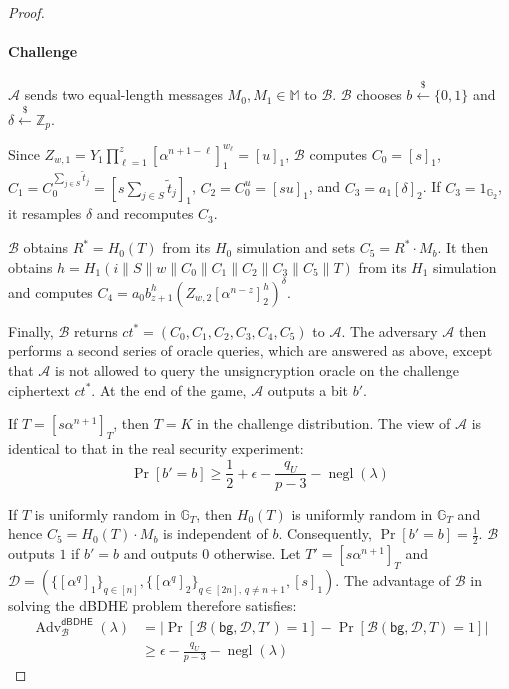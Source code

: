 \documentclass[sigconf,anonymous]{acmart}
\theoremstyle{definition}
\theoremstyle{definition}
\theoremstyle{definition}
\theoremstyle{definition}
\theoremstyle{definition}
\theoremstyle{definition}
\theoremstyle{definition}
\theoremstyle{definition}
\theoremstyle{definition}
\begin{document}
\begin{proof}
\begin{itemize}
	\end{itemize}
	
	\paragraph{\textbf{Challenge}}
	$\mathcal{A}$ sends two equal-length messages
	$M_0,M_1\in\mathbb{M}$ to $\mathcal{B}$.
	$\mathcal{B}$ chooses
	$b\overset{\$}{\leftarrow}\{0,1\}$ and
	$\delta\overset{\$}{\leftarrow}\mathbb{Z}_p$.
	
	Since
	$Z_{w,1}
	=Y_1\prod_{\ell=1}^{z}
	[\alpha^{n+1-\ell}]_1^{w_\ell}
	=[u]_1$,
	$\mathcal{B}$ computes
	$C_0=[s]_1$,
	$C_1=C_0^{\sum_{j\in S}\widetilde t_j}
	=[s\sum_{j\in S}\widetilde t_j]_1$,
	$C_2=C_0^u=[su]_1$, and
	$C_3=a_1[\delta]_2$.
	If $C_3=1_{\mathbb{G}_2}$, it resamples $\delta$ and recomputes $C_3$.
	
	$\mathcal{B}$ obtains $R^*=H_0(T)$ from its $H_0$ simulation and sets
	$C_5=R^*\cdot M_b$.
	It then obtains
	$h=H_1(i\parallel S\parallel w\parallel C_0\parallel C_1\parallel
	C_2\parallel C_3\parallel C_5\parallel T)$
	from its $H_1$ simulation and computes
	$C_4=a_0b_{z+1}^{h}
	(Z_{w,2}[\alpha^{n-z}]_2^{h})^{\delta}$.
	
	Finally, $\mathcal{B}$ returns
	$ct^{*}=(C_0,C_1,C_2,C_3,C_4,C_5)$
	to $\mathcal{A}$.
	The adversary $\mathcal{A}$ then performs a second series of oracle
	queries, which are answered as above, except that $\mathcal{A}$ is not
	allowed to query the unsigncryption oracle on the challenge ciphertext
	$ct^{*}$.
	At the end of the game, $\mathcal{A}$ outputs a bit $b'$.
	
	If $T=[s\alpha^{n+1}]_T$, then $T=K$ in the challenge distribution.
	The view of $\mathcal{A}$ is identical
	to that in the real security experiment:
	\[
	\Pr[b'=b]
	\geq
	\frac{1}{2}
	+
	\epsilon
	-
	\frac{q_U}{p-3}
	-
	\operatorname{negl}(\lambda)
	\]
	
	If $T$ is uniformly random in $\mathbb{G}_T$, then $H_0(T)$ is uniformly
	random in $\mathbb{G}_T$ and hence
	$C_5=H_0(T)\cdot M_b$ is independent of $b$.
	Consequently,
	$\Pr[b'=b]=\frac{1}{2}$.
	$\mathcal{B}$ outputs $1$ if $b'=b$ and outputs $0$ otherwise.
	Let
	$T'=[s\alpha^{n+1}]_T$ and
	$\mathcal{D}=
	(\{[\alpha^q]_1\}_{q\in[n]},
	\{[\alpha^q]_2\}_{q\in[2n],\,q\neq n+1},
	[s]_1)$.
	The advantage of $\mathcal{B}$ in solving the dBDHE problem therefore
	satisfies:
	\[
	\begin{aligned}
		\operatorname{Adv}_{\mathcal{B}}^{\mathsf{dBDHE}}(\lambda)
		&=
		\left|
		\Pr[\mathcal{B}(\mathsf{bg},\mathcal{D},T')=1]
		-
		\Pr[\mathcal{B}(\mathsf{bg},\mathcal{D},T)=1]
		\right|
		\\
		&\geq
		\epsilon
		-
		\frac{q_U}{p-3}
		-
		\operatorname{negl}(\lambda)
	\end{aligned}
	\]
	

\end{proof}
\end{document}
